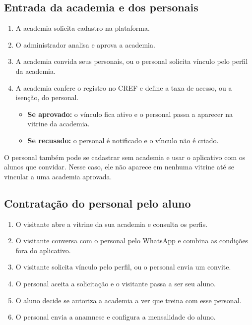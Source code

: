 \subsection{Entrada da academia e dos personais}
\begin{enumerate}
  \item A academia solicita cadastro na plataforma.
  \item O administrador analisa e aprova a academia.
  \item A academia convida seus personais, ou o personal solicita vínculo pelo perfil da academia.
  \item A academia confere o registro no CREF e define a taxa de acesso, ou a isenção, do personal.
  \begin{itemize}
    \item \textbf{Se aprovado:} o vínculo fica ativo e o personal passa a aparecer na vitrine da academia.
    \item \textbf{Se recusado:} o personal é notificado e o vínculo não é criado.
  \end{itemize}
\end{enumerate}

O personal também pode se cadastrar sem academia e usar o aplicativo com os alunos que convidar. Nesse caso, ele não aparece em nenhuma vitrine até se vincular a uma academia aprovada.

\subsection{Contratação do personal pelo aluno}
\begin{enumerate}
  \item O visitante abre a vitrine da sua academia e consulta os perfis.
  \item O visitante conversa com o personal pelo WhatsApp e combina as condições fora do aplicativo.
  \item O visitante solicita vínculo pelo perfil, ou o personal envia um convite.
  \item O personal aceita a solicitação e o visitante passa a ser seu aluno.
  \item O aluno decide se autoriza a academia a ver que treina com esse personal.
  \item O personal envia a anamnese e configura a mensalidade do aluno.
\end{enumerate}

